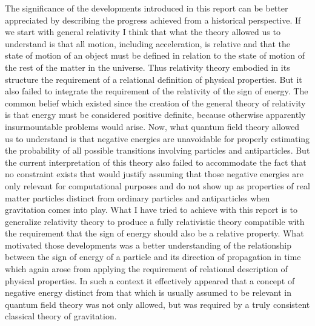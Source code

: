 \documentclass[notitlepage,12pt]{report}
\begin{document}
The significance of the developments introduced in this report can be better appreciated by describing the progress achieved from a historical perspective. If we start with general relativity I think that what the theory allowed us to understand is that all motion, including acceleration, is relative and that the state of motion of an object must be defined in relation to the state of motion of the rest of the matter in the universe. Thus relativity theory embodied in its structure the requirement of a relational definition of physical properties. But it also failed to integrate the requirement of the relativity of the sign of energy. The common belief which existed since the creation of the general theory of relativity is that energy must be considered positive definite, because otherwise apparently insurmountable problems would arise. Now, what quantum field theory allowed us to understand is that negative energies are unavoidable for properly estimating the probability of all possible transitions involving particles and antiparticles. But the current interpretation of this theory also failed to accommodate the fact that no constraint exists that would justify assuming that those negative energies are only relevant for computational purposes and do not show up as properties of real matter particles distinct from ordinary particles and antiparticles when gravitation comes into play. What I have tried to achieve with this report is to generalize relativity theory to produce a fully relativistic theory compatible with the requirement that the sign of energy should also be a relative property. What motivated those developments was a better understanding of the relationship between the sign of energy of a particle and its direction of propagation in time which again arose from applying the requirement of relational description of physical properties. In such a context it effectively appeared that a concept of negative energy distinct from that which is usually assumed to be relevant in quantum field theory was not only allowed, but was required by a truly consistent classical theory of gravitation.
\end{document}
